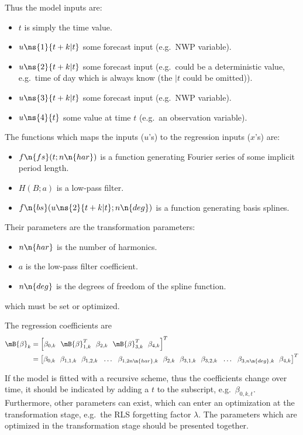 \begin{appendix}
Thus the model inputs are:
\begin{itemize}
\item $t$ is simply the time value.
\item $u\ns{1}{t+k|t}$ some forecast input (e.g.\ NWP variable).
\item $u\ns{2}{t+k|t}$ some forecast input (e.g.\ could be a deterministic
  value, e.g.\ time of day which is always know (the $|t$ could be omitted)).
\item $u\ns{3}{t+k|t}$ some forecast input (e.g.\ NWP variable).
\item $u\ns{4}{t}$ some value at time $t$ (e.g.\ an observation variable).
\end{itemize}
The functions which maps the inputs ($u$'s) to the regression inputs ($x$'s)
are:
\begin{itemize}
\item $f\n{fs}(t;n\n{har})$ is a function generating Fourier series of some
  implicit period length.
\item $H(B;a)$ is a low-pass filter.
\item $f\n{bs}(u\ns{2}{t+k|t};n\n{deg})$ is a function generating basis splines.
\end{itemize}
Their parameters are the transformation parameters:
\begin{itemize}
\item $n\n{har}$ is the number of harmonics.
\item $a$ is the low-pass filter coefficient.
\item $n\n{deg}$ is the degrees of freedom of the spline function.
\end{itemize}
which must be set or optimized.

The regression coefficients are
\begin{align}
  \mB{\beta}_k &= \left[\beta_{0,k} ~~ \mB{\beta}^T_{1,k} ~~ \beta_{2,k} ~~
    \mB{\beta}^T_{3,k} ~~ \beta_{4,k}\right]^T\\
  &=\left[ \beta_{0,k} ~~
    \beta_{1,1,k} ~~ \beta_{1,2,k} ~~ \dots ~~ \beta_{1,2n\n{har},k} ~~ 
    \beta_{2,k} ~~
    \beta_{3,1,k} ~~ \beta_{3,2,k} ~~ \dots ~~ \beta_{3,n\n{deg},k} ~~ 
    \beta_{4,k}\right]^T
\end{align}

If the model is fitted with a recursive scheme, thus the coefficients change
over time, it should be indicated by adding a $t$ to the subscript,
e.g.\ $\beta_{0,k,t}$. Furthermore, other parameters can exist, which can enter
an optimization at the transformation stage, e.g.\ the RLS forgetting factor
$\lambda$. The parameters which are optimized in the transformation stage
should be presented together.


\end{appendix}
